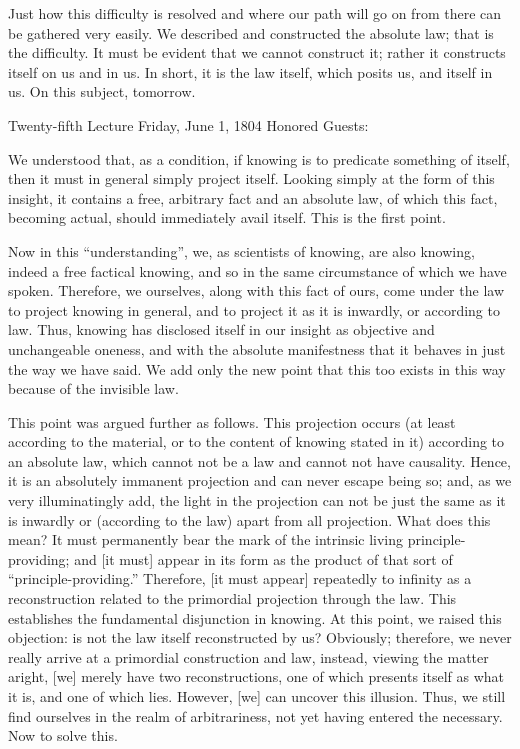 Just how this difficulty is resolved
and where our path will go on from there
can be gathered very easily.
We described and constructed the absolute law;
that is the difficulty.
It must be evident that we cannot construct it;
rather it constructs itself on us and in us.
In short, it is the law itself,
which posits us, and itself in us.
On this subject, tomorrow.

Twenty-fifth Lecture
Friday, June 1, 1804
Honored Guests:

We understood that, as a condition,
if knowing is to predicate something of itself,
then it must in general simply project itself.
Looking simply at the form of this insight,
it contains a free, arbitrary fact and an absolute law,
of which this fact, becoming actual,
should immediately avail itself.
This is the first point.

Now in this “understanding”, we, as scientists of knowing,
are also knowing, indeed a free factical knowing,
and so in the same circumstance of which we have spoken.
Therefore, we ourselves, along with this fact of ours,
come under the law to project knowing in general,
and to project it as it is inwardly, or according to law.
Thus, knowing has disclosed itself in our insight
as objective and unchangeable oneness,
and with the absolute manifestness that
it behaves in just the way we have said.
We add only the new point that this too
exists in this way because of the invisible law.

This point was argued further as follows.
This projection occurs
(at least according to the material,
or to the content of knowing stated in it)
according to an absolute law,
which cannot not be a law
and cannot not have causality.
Hence, it is an absolutely immanent projection
and can never escape being so;
and, as we very illuminatingly add,
the light in the projection can not be just
the same as it is inwardly or
(according to the law)
apart from all projection.
What does this mean?
It must permanently bear the mark of
the intrinsic living principle-providing;
and [it must] appear in its form as
the product of that sort of “principle-providing.”
Therefore, [it must appear] repeatedly to infinity
as a reconstruction related to
the primordial projection through the law.
This establishes the fundamental disjunction in knowing.
At this point, we raised this objection:
is not the law itself reconstructed by us?
Obviously; therefore, we never really arrive
at a primordial construction and law,
instead, viewing the matter aright,
[we] merely have two reconstructions,
one of which presents itself as what it is,
and one of which lies.
However, [we] can uncover this illusion.
Thus, we still find ourselves in
the realm of arbitrariness,
not yet having entered the necessary.
Now to solve this.

